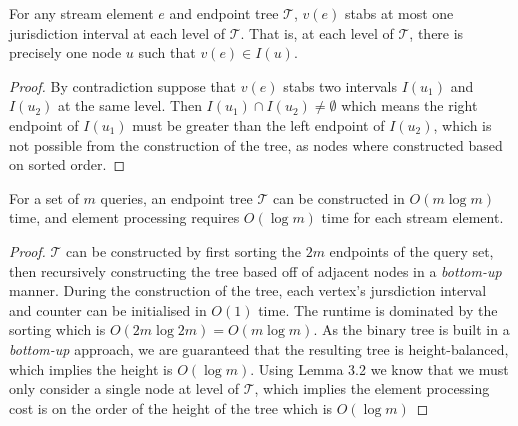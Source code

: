 \begin{lemma} For any stream element $e$ and endpoint tree $\mathcal{T}$, $v(e)$ stabs at most one jurisdiction interval at each level of $\mathcal{T}$. That is, at each level of $\mathcal{T}$, there is precisely one node $u$ such that $v(e)\in I(u)$.
\end{lemma}
\begin{proof}
    By contradiction suppose that $v(e)$ stabs two intervals $I(u_1)$ and $I(u_2)$ at the same level. Then $I(u_1) \cap I(u_2)\neq \emptyset$ which means the right endpoint of $I(u_1)$ must be greater than the left endpoint of $I(u_2)$, which is not possible from the construction of the tree, as nodes where constructed based on sorted order.
\end{proof}

\begin{lemma} For a set of $m$ queries, an endpoint tree $\mathcal{T}$ can be constructed in $O(m\log m)$ time, and element processing requires $O(\log m)$ time for each stream element.
\end{lemma}
\begin{proof}
     $\mathcal{T}$ can be constructed by first sorting the $2m$ endpoints of the query set, then recursively constructing the tree based off of adjacent nodes in a \textit{bottom-up} manner. During the construction of the tree, each vertex's jursdiction interval and counter can be initialised in $O(1)$ time. The runtime is dominated by the sorting which is $O(2m \log 2m) = O(m\log m)$. As the binary tree is built in a \textit{bottom-up} approach, we are guaranteed that the resulting tree is height-balanced, which implies the height is $O(\log m)$. Using Lemma 3.2 we know that we must only consider a single node at level of $\mathcal{T}$, which implies the element processing cost is on the order of the height of the tree which is $O(\log m)$
\end{proof}

